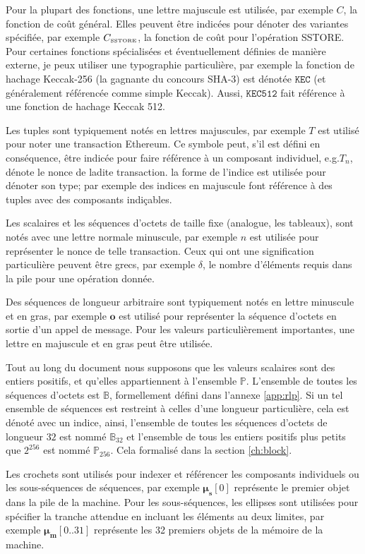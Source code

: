 \documentclass[9pt,oneside]{amsart}
\makeatletter
\newcommand*\eg{e.g.\@\xspace}
\makeatother
\begin{document}
\begin{multicols}{2}
Pour la plupart des fonctions, une lettre majuscule est utilisée, par exemple $C$, la fonction de coût général. Elles peuvent être indicées pour dénoter des variantes spécifiée, par exemple $C_\text{\tiny SSTORE}$,
la fonction de coût pour l'opération {\tiny SSTORE}. Pour certaines fonctions spécialisées et éventuellement définies de manière externe, je peux utiliser une typographie particulière, par exemple la fonction de hachage Keccak-256 (la gagnante du concours SHA-3) est dénotée $\texttt{KEC}$ (et généralement référencée comme simple Keccak). Aussi, $\texttt{KEC512}$ fait référence à une fonction de hachage Keccak 512.

Les tuples sont typiquement notés en lettres majuscules, par exemple $T$ est utilisé pour noter une transaction Ethereum. Ce symbole peut, s’il est défini en conséquence, être indicée pour faire référence à un composant individuel, \eg $T_n$, dénote le nonce de ladite transaction. la forme de l'indice est utilisée pour dénoter son type; par exemple des indices en majuscule font référence à des tuples avec des composants indiçables.

Les scalaires et les séquences d'octets de taille fixe (analogue, les tableaux), sont notés avec une lettre normale minuscule, par exemple $n$ est utilisée pour représenter le nonce de telle transaction. Ceux qui ont une signification particulière peuvent être grecs, par exemple $\delta$, le nombre d'éléments requis dans la pile pour une opération donnée.

Des séquences de longueur arbitraire sont typiquement notés en lettre minuscule et en gras, par exemple $\mathbf{o}$ est utilisé pour représenter la séquence d'octets en sortie d'un appel de message. Pour les valeurs particulièrement importantes, une lettre en majuscule et en gras peut être utilisée.

Tout au long du document nous supposons que les valeurs scalaires sont des entiers positifs, et qu'elles appartiennent à l'ensemble $\mathbb{P}$. L'ensemble de toutes les séquences d'octets est $\mathbb{B}$, formellement défini dans l'annexe \ref{app:rlp}. Si un tel ensemble de séquences est restreint à celles d'une longueur particulière, cela est dénoté avec un indice, ainsi, l'ensemble de toutes les séquences d'octets de longueur $32$  est nommé $\mathbb{B}_{32}$ et l'ensemble de tous les entiers positifs plus petits que $2^{256}$ est nommé $\mathbb{P}_{256}$. Cela formalisé dans la section \ref{ch:block}.

Les crochets sont utilisés pour indexer et référencer les composants individuels ou les sous-séquences de séquences, par exemple $\boldsymbol{\mu}_\mathbf{s}[0]$ représente le premier objet dans la pile de la machine. Pour les sous-séquences, les ellipses sont utilisées pour spécifier la tranche attendue en incluant les éléments au deux limites, par exemple $\boldsymbol{\mu}_\mathbf{m}[0..31]$ représente les 32 premiers objets de la mémoire de la machine.


\end{multicols}
\end{document}
